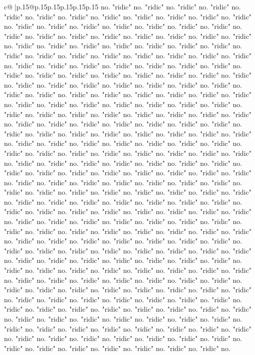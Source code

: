 \documentclass{article}
\begin{document}
{\begin{supertabular}{c@{$\;$}|p{.15\linewidth}@{}p{.15\linewidth}p{.15\linewidth}p{.15\linewidth}p{.15\linewidth}p{.15\linewidth}}
{{{no. "ridic" no. "ridic" no. "ridic" no. "ridic" no. "ridic" no. "ridic" no. "ridic" no. "ridic" no. "ridic" no. "ridic" no. "ridic" no. "ridic" no. "ridic" no. "ridic" no. "ridic" no. "ridic" no. "ridic" no. "ridic" no. "ridic" no. "ridic" no. "ridic" no. "ridic" no. "ridic" no. "ridic" no. "ridic" no. "ridic" no. "ridic" no. "ridic" no. "ridic" no. "ridic" no. "ridic" no. "ridic" no. "ridic" no. "ridic" no. "ridic" no. "ridic" no. "ridic" no. "ridic" no. "ridic" no. "ridic" no. "ridic" no. "ridic" no. "ridic" no. "ridic" no. "ridic" no. "ridic" no. "ridic" no. "ridic" no. "ridic" no. "ridic" no. "ridic" no. "ridic" no. "ridic" no. "ridic" no. "ridic" no. "ridic" no. "ridic" no. "ridic" no. "ridic" no. "ridic" no. "ridic" no. "ridic" no. "ridic" no. "ridic" no. "ridic" no. "ridic" no. "ridic" no. "ridic" no. "ridic" no. "ridic" no. "ridic" no. "ridic" no. "ridic" no. "ridic" no. "ridic" no. "ridic" no. "ridic" no. "ridic" no. "ridic" no. "ridic" no. "ridic" no. "ridic" no. "ridic" no. "ridic" no. "ridic" no. "ridic" no. "ridic" no. "ridic" no. "ridic" no. "ridic" no. "ridic" no. "ridic" no. "ridic" no. "ridic" no. "ridic" no. "ridic" no. "ridic" no. "ridic" no. "ridic" no. "ridic" no. "ridic" no. "ridic" no. "ridic" no. "ridic" no. "ridic" no. "ridic" no. "ridic" no. "ridic" no. "ridic" no. "ridic" no. "ridic" no. "ridic" no. "ridic" no. "ridic" no. "ridic" no. "ridic" no. "ridic" no. "ridic" no. "ridic" no. "ridic" no. "ridic" no. "ridic" no. "ridic" no. "ridic" no. "ridic" no. "ridic" no. "ridic" no. "ridic" no. "ridic" no. "ridic" no. "ridic" no. "ridic" no. "ridic" no. "ridic" no. "ridic" no. "ridic" no. "ridic" no. "ridic" no. "ridic" no. "ridic" no. "ridic" no. "ridic" no. "ridic" no. "ridic" no. "ridic" no. "ridic" no. "ridic" no. "ridic" no. "ridic" no. "ridic" no. "ridic" no. "ridic" no. "ridic" no. "ridic" no. "ridic" no. "ridic" no. "ridic" no. "ridic" no. "ridic" no. "ridic" no. "ridic" no. "ridic" no. "ridic" no. "ridic" no. "ridic" no. "ridic" no. "ridic" no. "ridic" no. "ridic" no. "ridic" no. "ridic" no. "ridic" no. "ridic" no. "ridic" no. "ridic" no. "ridic" no. "ridic" no. "ridic" no. "ridic" no. "ridic" no. "ridic" no. "ridic" no. "ridic" no. "ridic" no. "ridic" no. "ridic" no. "ridic" no. "ridic" no. "ridic" no. "ridic" no. "ridic" no. "ridic" no. "ridic" no. "ridic" no. "ridic" no. "ridic" no. "ridic" no. "ridic" no. "ridic" no. "ridic" no. "ridic" no. "ridic" no. "ridic" no. "ridic" no. "ridic" no. "ridic" no. "ridic" no. "ridic" no. "ridic" no. "ridic" no. "ridic" no. "ridic" no. "ridic" no. "ridic" no. "ridic" no. "ridic" no. "ridic" no. "ridic" no. "ridic" no. "ridic" no. "ridic" no. "ridic" no. "ridic" no. "ridic" no. "ridic" no. "ridic" no. "ridic" no. "ridic" no. "ridic" no. "ridic" no. "ridic" no. "ridic" no. "ridic" no. "ridic" no. "ridic" no. "ridic" no. "ridic" no. "ridic" no. "ridic" no. "ridic" no. "ridic" no. "ridic" no. "ridic" no. "ridic" no. "ridic" no. "ridic" no. "ridic" no. "ridic" no. "ridic" no. "ridic" no. "ridic" no. "ridic" no. "ridic" no. "ridic" no. "ridic" no. "ridic" no. "ridic" no. "ridic" no. "ridic" no. "ridic" no. "ridic" no. "ridic" no. "ridic" no. "ridic" no. "ridic" no. "ridic" no. }}}
\end{supertabular}}
\end{document}
